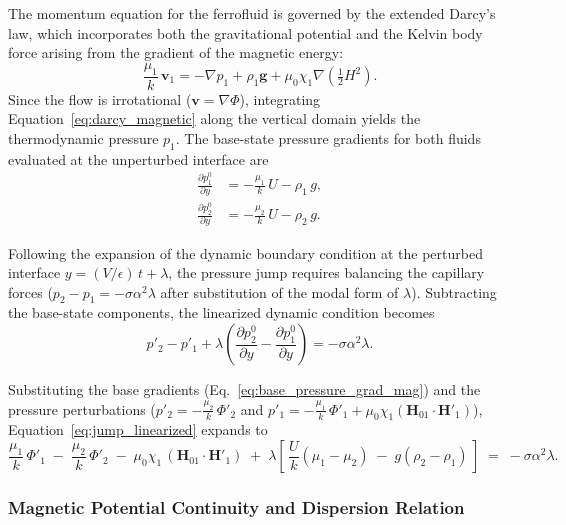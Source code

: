 The momentum equation for the ferrofluid is governed by the extended Darcy's law, which incorporates both the gravitational potential and the Kelvin body force arising from the gradient of the magnetic energy:
\begin{equation} \label{eq:darcy_magnetic}
    \frac{\mu_1}{k}\, \mathbf{v}_1 = -\nabla p_1 + \rho_1 \mathbf{g} + \mu_0 \chi_1 \nabla \!\left( \tfrac{1}{2} H^2 \right).
\end{equation}
Since the flow is irrotational ($\mathbf{v} = \nabla \Phi$), integrating Equation~\ref{eq:darcy_magnetic} along the vertical domain yields the thermodynamic pressure $p_1$. The base-state pressure gradients for both fluids evaluated at the unperturbed interface are
\begin{align} \label{eq:base_pressure_grad_mag}
    \frac{\partial p_1^0}{\partial y} &= -\frac{\mu_1}{k}\, U - \rho_1\, g, \\
    \frac{\partial p_2^0}{\partial y} &= -\frac{\mu_2}{k}\, U - \rho_2\, g.
\end{align}

Following the expansion of the dynamic boundary condition at the perturbed interface $y = (V/\epsilon)\,t + \lambda$, the pressure jump requires balancing the capillary forces ($p_2 - p_1 = -\sigma \alpha^2 \lambda$ after substitution of the modal form of $\lambda$). Subtracting the base-state components, the linearized dynamic condition becomes
\begin{equation} \label{eq:jump_linearized}
    p'_2 - p'_1 + \lambda \!\left( \frac{\partial p_2^0}{\partial y} - \frac{\partial p_1^0}{\partial y} \right) = -\sigma \alpha^2 \lambda.
\end{equation}

Substituting the base gradients (Eq.~\ref{eq:base_pressure_grad_mag}) and the pressure perturbations ($p'_2 = -\frac{\mu_2}{k}\, \Phi'_2$ and $p'_1 = -\frac{\mu_1}{k}\, \Phi'_1 + \mu_0 \chi_1 (\mathbf{H}_{01} \cdot \mathbf{H}'_1)$), Equation~\ref{eq:jump_linearized} expands to
\begin{equation} \label{eq:jump_expanded}
    \frac{\mu_1}{k}\, \Phi'_1 \;-\; \frac{\mu_2}{k}\, \Phi'_2
    \;-\; \mu_0 \chi_1\, (\mathbf{H}_{01} \cdot \mathbf{H}'_1)
    \;+\; \lambda\!\left[\,\frac{U}{k}(\mu_1 - \mu_2) \;-\; g(\rho_2 - \rho_1)\,\right]
    \;=\; -\sigma \alpha^2 \lambda.
\end{equation}

\subsubsection{Magnetic Potential Continuity and Dispersion Relation}

